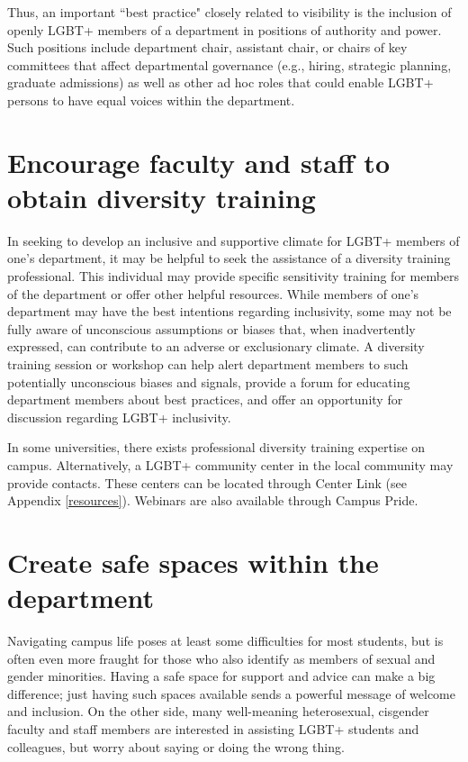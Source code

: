 Thus, an important ``best practice" closely related to visibility is the inclusion of openly LGBT+ members of a department in positions of authority and power. Such positions include department chair, assistant chair, or chairs of key committees that affect departmental governance (e.g., hiring, strategic planning, graduate admissions) as well as other ad hoc roles that could enable LGBT+ persons to have equal voices within the department.


\section {Encourage faculty and staff to obtain diversity training}
\label{diversity-training}
In seeking to develop an inclusive and supportive climate for LGBT+ members of one's department, it may be helpful to seek the assistance of a diversity training professional. This individual may provide specific sensitivity training for members of the department or offer other helpful resources. While members of one's department may have the best intentions regarding inclusivity, some may not be fully aware of unconscious assumptions or biases that, when inadvertently expressed, can contribute to an adverse or exclusionary climate. A diversity training session or workshop can help alert department members to such potentially unconscious biases and signals, provide a forum for educating department members about best practices, and offer an opportunity for discussion regarding LGBT+ inclusivity.

In some universities, there exists professional diversity training expertise on campus. Alternatively, a LGBT+ community center in the local community may provide contacts. These centers can be located through Center Link (see Appendix \ref{resources}). Webinars are also available through Campus Pride.


\section {Create safe spaces within the department}
\label{safe-spaces}
Navigating campus life poses at least some difficulties for most students, but is often even more fraught for those who also identify as members of sexual and gender minorities. Having a safe space for support and advice can make a big difference; just having such spaces available sends a powerful message of welcome and inclusion. On the other side, many well-meaning heterosexual, cisgender faculty and staff members are interested in assisting LGBT+ students and colleagues, but worry about saying or doing the wrong thing.

